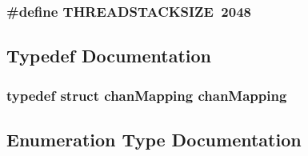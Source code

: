 \subsubsection[{T\+H\+R\+E\+A\+D\+S\+T\+A\+C\+K\+S\+I\+Z\+E}]{\setlength{\rightskip}{0pt plus 5cm}\#define T\+H\+R\+E\+A\+D\+S\+T\+A\+C\+K\+S\+I\+Z\+E~2048}\label{_swallow-n_o_s__asm_8h_a21e454ec7311762ec0390b5c771791c1}


\subsection{Typedef Documentation}
\hypertarget{_swallow-n_o_s__asm_8h_acfda9b7ba12713ce46649ec7550afec8}{}
\subsubsection[{chan\+Mapping}]{\setlength{\rightskip}{0pt plus 5cm}typedef struct {\bf chan\+Mapping}  {\bf chan\+Mapping}}\label{_swallow-n_o_s__asm_8h_acfda9b7ba12713ce46649ec7550afec8}


\subsection{Enumeration Type Documentation}
\hypertarget{_swallow-n_o_s__asm_8h_a2c85818d9b314baf7682c74f9e2cacb9}{}
